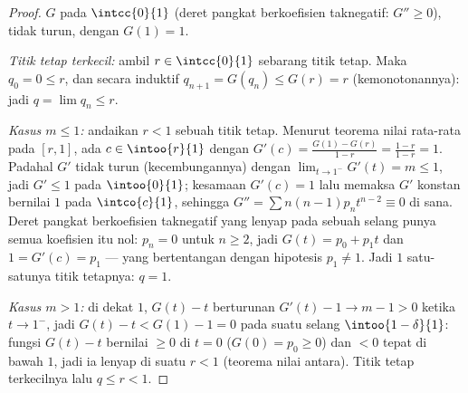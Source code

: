 \begin{proof}
$G$  pada $\intcc{0}{1}$ (deret pangkat berkoefisien
taknegatif: $G'' \geq 0$), tidak turun, dengan $G(1) = 1$.

\emph{Titik tetap terkecil:} ambil $r \in \intcc{0}{1}$ sebarang titik
tetap. Maka $q_0 = 0 \leq r$, dan secara induktif $q_{n+1} = G(q_n)
\leq G(r) = r$ (kemonotonannya): jadi $q = \lim q_n \leq r$.

\emph{Kasus $m \leq 1$:} andaikan $r < 1$ sebuah titik tetap. Menurut
teorema nilai rata-rata pada $[r, 1]$, ada $c \in \intoo{r}{1}$ dengan
$G'(c) = \frac{G(1) - G(r)}{1 - r} = \frac{1 - r}{1 - r} = 1$. Padahal
$G'$ tidak turun (kecembungannya) dengan $\lim_{t\to1^-}G'(t) = m
\leq 1$, jadi $G' \leq 1$ pada $\intoo{0}{1}$; kesamaan $G'(c) =
1$ lalu memaksa $G'$ konstan bernilai $1$ pada $\intco{c}{1}$,
sehingga $G'' = \sum n(n-1)p_nt^{n-2} \equiv 0$ di sana. Deret pangkat
berkoefisien taknegatif yang lenyap pada sebuah selang punya semua
koefisien itu nol: $p_n = 0$ untuk $n \geq 2$, jadi $G(t) = p_0
+ p_1t$ dan $1 = G'(c) = p_1$ --- yang bertentangan dengan hipotesis
$p_1 \neq 1$. Jadi $1$ satu-satunya titik tetapnya: $q = 1$.

\emph{Kasus $m > 1$:} di dekat $1$, $G(t) - t$ berturunan $G'(t) -
1 \to m - 1 > 0$ ketika $t \to 1^-$, jadi $G(t) - t < G(1) - 1 = 0$ pada
suatu selang $\intoo{1 - \delta}{1}$: fungsi 
$G(t) - t$ bernilai $\geq 0$ di $t = 0$ ($G(0) = p_0 \geq 0$) dan $< 0$
tepat di bawah $1$, jadi ia lenyap di suatu $r < 1$ (teorema nilai
antara). Titik tetap terkecilnya lalu $q \leq r < 1$.
\end{proof}

